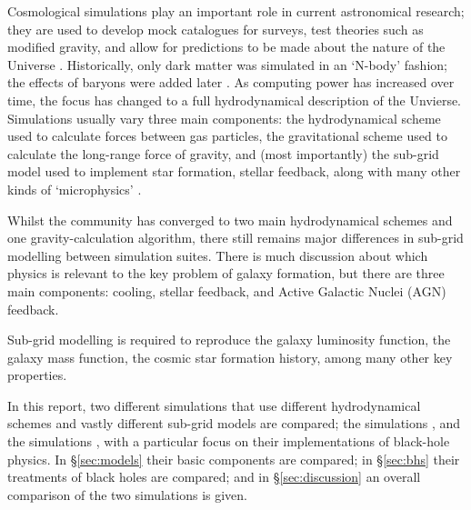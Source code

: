 Cosmological simulations play an important role in current astronomical
research; they are used to develop mock catalogues for surveys, test theories
such as modified gravity, and allow for predictions to be made about the nature
of the Universe \citep{smith_lightcone_2017, arnold_zoomed_2016,
schaye_eagle_2015}. Historically, only dark matter was simulated in an `N-body'
fashion; the effects of baryons were added later \citep{lemson_halo_2006,
lacey_unified_2016}. As computing power has increased over time, the focus has
changed to a full hydrodynamical description of the Unvierse. Simulations
usually vary three main components: the hydrodynamical scheme used to calculate
forces between gas particles, the gravitational scheme used to calculate the
long-range force of gravity, and (most importantly) the sub-grid model used to
implement star formation, stellar feedback, along with many other kinds of
`microphysics' \citep[see e.g.][]{vogelsberger_introducing_2014,
schaye_eagle_2015, pillepich_simulating_2018}.

Whilst the community has converged to two main hydrodynamical schemes and one
gravity-calculation algorithm, there still remains major differences in
sub-grid modelling between simulation suites. There is much discussion about
which physics is relevant to the key problem of galaxy formation, but there
are three main components: cooling, stellar feedback, and Active Galactic
Nuclei (AGN) feedback.

Sub-grid modelling is required to reproduce the galaxy luminosity function,
the galaxy mass function, the cosmic star formation history, among many
other key properties.

In this report, two different simulations that use different hydrodynamical
schemes and vastly different sub-grid models are compared; the \hagn{}
simulations \citep{dubois_dancing_2014}, and the \fire{} simulations
\citep{hopkins_fire-2_2017}, with a particular focus on their implementations
of black-hole physics. In §\ref{sec:models} their basic components are
compared; in §\ref{sec:bhs} their treatments of black holes are compared; and
in §\ref{sec:discussion} an overall comparison of the two simulations is given. 

